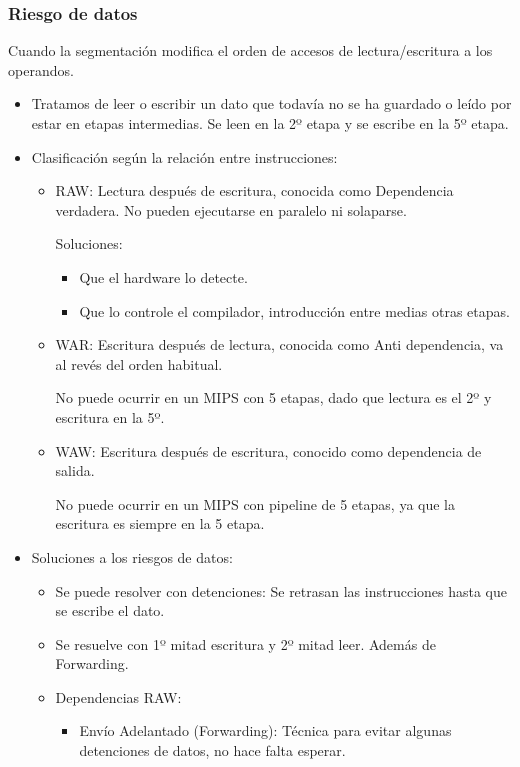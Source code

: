 \documentclass[12pt, twoside, openright]{report} %
\begin{document}
    \subsubsection{Riesgo de datos} Cuando la segmentación modifica el orden de accesos de lectura/escritura a los operandos.
    \begin{itemize}
      \item Tratamos de leer o escribir un dato que todavía no se ha guardado o leído por estar en etapas intermedias. Se leen en la 2º etapa y se escribe en la 5º etapa.
      \item Clasificación según la relación entre instrucciones:
      \begin{itemize}
        \item RAW: Lectura después de escritura, conocida como Dependencia verdadera. No pueden ejecutarse en paralelo ni solaparse.
        
        Soluciones:
        \begin{itemize}
          \item Que el hardware lo detecte.
          
          \item Que lo controle el compilador, introducción entre medias otras etapas.
        \end{itemize}    
          
       
        \item WAR: Escritura después de lectura, conocida como Anti dependencia, va al revés del orden habitual.
        
        No puede ocurrir en un MIPS con 5 etapas, dado que lectura es el 2º y escritura en la 5º.
        \item WAW: Escritura después de escritura, conocido como dependencia de salida.
        
        No puede ocurrir en un MIPS con pipeline de 5 etapas, ya que la escritura es siempre en la 5 etapa.
      \end{itemize}
          
      \item Soluciones a los riesgos de datos:
      \begin{itemize}
        \item Se puede resolver con detenciones: Se retrasan las instrucciones hasta que se escribe el dato.
        \item Se resuelve con 1º mitad escritura y 2º mitad leer. Además de Forwarding.
        \item Dependencias RAW:
        \begin{itemize}
          \item Envío Adelantado (Forwarding): Técnica para evitar algunas detenciones de datos, no hace falta esperar.


\end{itemize}
\end{itemize}
\end{itemize}
\end{document}

